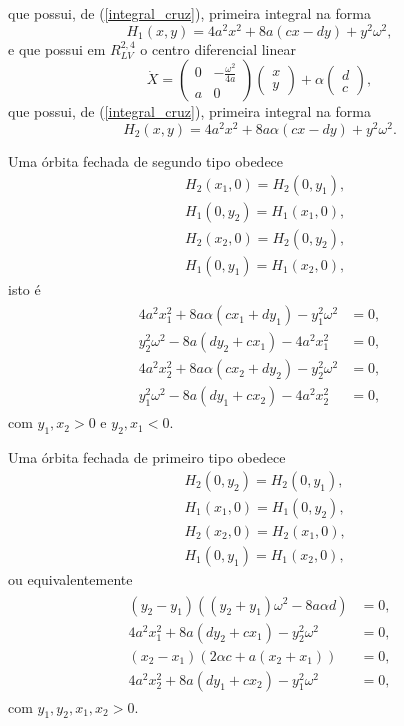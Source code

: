 que possui, de (\ref{integral_cruz}), primeira integral na forma
$$H_1(x, y) = 4a^2 x^2 +8a(cx−dy) +y^2\omega^2,
$$
e que possui em $R^{2,4}_{LV}$ o centro diferencial linear 
\begin{equation}
\label{A2}
\dot{X}=\left(\begin{array}{cc}
0 & -\frac{\omega^{2}}{4a} \\
a & 0
\end{array}\right)\left(\begin{array}{l}
x \\
y
\end{array}\right)+\alpha\left(\begin{array}{l}
d \\
c
\end{array}\right),
\end{equation}
que possui, de (\ref{integral_cruz}), primeira integral na forma
$$H_2(x, y) = 4a^2 x^2 +8a\alpha(cx−dy) +y^2\omega^2.
$$

Uma órbita fechada de segundo tipo obedece 
\begin{align*}
    &H_2(x_1, 0) =H_2(0, y_1), \\
&H_1(0, y_2) =H_1(x_1, 0), \\
&H_2(x_2, 0) =H_2(0, y_2),\\
&H_1(0, y_1) =H_1(x_2, 0),
\end{align*}
isto é
\begin{gather}
\begin{aligned}
\label{equipott2}
      4a^2 x_1^2 +8a \alpha (cx_1+ d y_1 )- y_1^2\omega^2&=0,\\
y_2^2\omega^2-8a(dy_2+cx_1)- 4a^2 x_1^2 &=0, \\
4a^2 x_2^2 +8a \alpha( c x_2+dy_2)- y_2^2\omega^2&=0,\\
 y_1^2\omega^2-8a(dy_1+cx_2)- 4a^2 x_2^2 &=0,
\end{aligned}
\end{gather}
com $y_1,x_2>0$ e $y_2,x_1<0$.

Uma órbita fechada de primeiro tipo obedece
\begin{align*}
&H_2(0, y_2) =H_2(0, y_1),
\\&H_1(x_1, 0)=H_1(0, y_2),
\\&H_2(x_2, 0)=H_2(x_1,0),
\\&H_1(0, y_1) =H_1(x_2, 0),
\end{align*}
ou equivalentemente
\begin{gather}
\begin{aligned}
\label{equipott1}
    (y_2 - y_1)((y_2 + y_1)\omega^2-8 a\alpha d)&=0,
\\ 4a^2 x_1^2 +8a(dy_2+cx_1) - y_2^2\omega^2&=0,
\\ ( x_2- x_1) (2\alpha c+a(x_2+x_1)) & =0,
\\4a^2 x_2^2+8a(dy_1+cx_2)- y_1^2\omega^2 &=0,
\end{aligned}
\end{gather}
com $y_1,y_2,x_1,x_2>0$.

